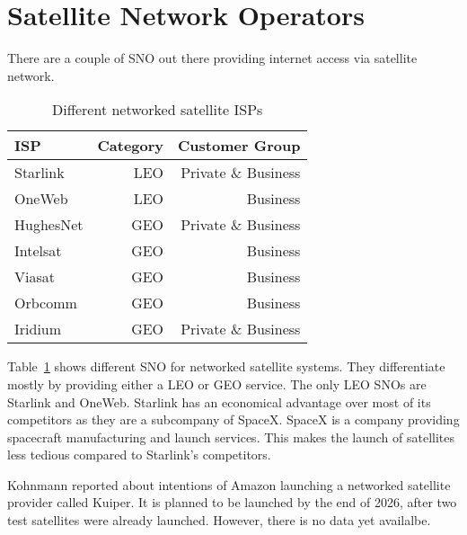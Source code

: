 \section{Satellite Network Operators} \label{sec>isps}

There are a couple of \ac{SNO} out there providing internet access via
satellite network.

\begin{table}[]
	\caption{Different networked satellite ISPs}
	\label{fig:satellite-isp}
	\begin{tabular}{lrr}
		\toprule
		ISP       & Category & Customer Group      \\
		\midrule
		Starlink  & LEO      & Private \& Business \\
		OneWeb    & LEO      & Business            \\
		HughesNet & GEO      & Private \& Business \\
		Intelsat  & GEO      & Business            \\
		Viasat    & GEO      & Business            \\
		Orbcomm   & GEO      & Business            \\
		Iridium   & GEO      & Private \& Business \\
		\bottomrule
	\end{tabular}
\end{table}

Table~\ref{fig:satellite-isp} shows different \ac{SNO} for networked satellite
systems. They differentiate mostly by providing either a \ac{LEO} or \ac{GEO}
service. The only \ac{LEO} \ac{SNO}s are Starlink and OneWeb. Starlink has an
economical advantage over most of its competitors as they are a subcompany of
SpaceX. SpaceX is a company providing spacecraft manufacturing and launch
services. This makes the launch of satellites less tedious compared to
Starlink's competitors.

Kohnmann \cite{Kohnmann24} reported about intentions of Amazon launching a
networked satellite provider called Kuiper. It is planned to be launched by the
end of 2026, after two test satellites were already launched. However, there is
no data yet availalbe.
